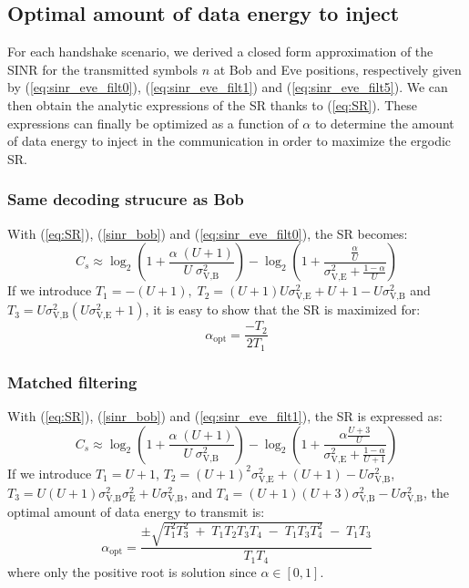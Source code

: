 \documentclass[journal,comsoc]{IEEEtran}
\begin{document}
\subsection{Optimal amount of data energy to inject}
\label{subsec:best_alpha}
For each handshake scenario, we derived a closed form approximation of the SINR for the transmitted symbols $n$ at Bob and Eve positions, respectively given by (\ref{eq:sinr_eve_filt0}), (\ref{eq:sinr_eve_filt1}) and (\ref{eq:sinr_eve_filt5}). We can  then obtain the analytic expressions of the SR thanks to (\ref{eq:SR}). These expressions can finally be optimized as a function of $\alpha$ to determine the amount of data energy to inject in the communication in order to maximize the ergodic SR.
\subsubsection{Same decoding strucure as Bob}
 With (\ref{eq:SR}), (\ref{sinr_bob}) and (\ref{eq:sinr_eve_filt0}), the SR becomes:
\begin{equation}
C_s \approx \log_2 \left( 1 +  \frac{\alpha \;(U+1)}{U \; \sigma_{\text{V,B}}^2} \right) - \log_2\left( 1 + \frac{\frac{\alpha}{U}}{\sigma^2_{\text{V,E}}+\frac{1-\alpha}{U}}\right)
\label{eq:SR_anal2_decod_0}
\end{equation}
If we introduce $T_1=-(U+1),  \; T_2 = (U+1)U\sigma_{\text{V,E}}^2 + U + 1- U\sigma_{\text{V,B}}^2 $ and $T_3 = U\sigma_{\text{V,B}}^2(U\sigma_{\text{V,E}}^2+1)$, it is easy to show that the SR is maximized for:
\begin{equation}
\alpha_{\text{opt}} = \frac{-T_2}{2T_1}
\label{eq:optimal_alpha_decod_0}
\end{equation}


\subsubsection{Matched filtering}
With (\ref{eq:SR}), (\ref{sinr_bob}) and (\ref{eq:sinr_eve_filt1}), the SR is expressed as:
\begin{equation}
C_s \approx \log_2 \left( 1 +  \frac{\alpha \;(U+1)}{U \; \sigma_{\text{V,B}}^2} \right) - \log_2\left( 1 +  \frac{\alpha \frac{U+3}{U}}{\sigma^2_{\text{V,E}} + \frac{1-\alpha}{U+1}}\right)
\label{eq:SR_anal2_decod_1}
\end{equation}
If we introduce $T_1 = U+1$, $T_2 = (U+1)^2\sigma_{\text{V,E}}^2 + (U+1) - U\sigma_{\text{V,B}}^2$, $T_3 = U(U+1)\sigma_{\text{V,B}}^2\sigma_{\text{E}}^2 + U \sigma_{\text{V,B}}^2$, and $T_4=(U+1)(U+3)\sigma_{\text{V,B}}^2-U\sigma_{\text{V,B}}^2$, the optimal amount of data energy to transmit is: 
\begin{equation}
\alpha_{\text{opt}} = \frac{\pm\sqrt{T_1^2 T_3^2 \; + \; T_1 T_2 T_3 T_4 \; - \; T_1 T_3 T_4^2} \; - \; T_1 T_3}{T_1 T_4}
\label{eq:optimal_alpha_decod_1}
\end{equation}
where only the positive root is solution since $\alpha \in [0,1]$.
\end{document}

